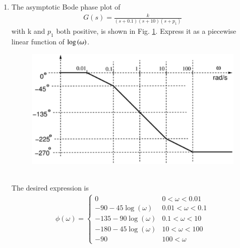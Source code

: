 \begin{enumerate}[label=\thesubsection.\arabic*.,ref=\thesubsection.\theenumi]


\item The asymptotic Bode phase plot of 
%
\begin{align}
\label{eq:ee18btech11037_gs}
G(s) = \frac{k}{(s+0.1)(s+10)(s+{p_1})}
\end{align}
%
with k and $p_1$ both positive, is shown in Fig. \ref{fig:ee18btech11037}.  Express it as a piecewise linear function of $\log \left(\omega\right)$.
\begin{figure}[!ht]
\centering
\includegraphics[width=\columnwidth]{./figs/ee18btech11037/ee18btech11037.eps}
\caption{}
\label{fig:ee18btech11037}
\end{figure}
\\
\solution The desired expression is
\begin{align}
\label{eq:ee18btech11037_totalphase}
 \phi(\omega) = 
 \begin{cases} 
        0 & 0<\omega<0.01 \\
      -90-45\log(\omega)& 0.01<\omega<0.1 \\
      -135-90\log(\omega)& 0.1<\omega<10 \\
      -180-45\log(\omega)& 10<\omega<100 \\
      -90 & 100<\omega  
 \end{cases}
\end{align}


\end{enumerate}
